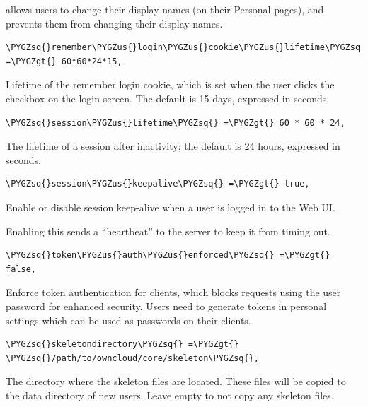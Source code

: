 \documentclass[letterpaper,10pt,english]{sphinxmanual}
\def\PYGZus{\char`\_}
\def\PYGZgt{\char`\>}
\def\PYGZsq{\char`\'}
\begin{document}
 allows users to change their display names (on their Personal
pages), and  prevents them from changing their display names.

\begin{Verbatim}[commandchars=\\\{\}]
\PYGZsq{}remember\PYGZus{}login\PYGZus{}cookie\PYGZus{}lifetime\PYGZsq{} =\PYGZgt{} 60*60*24*15,
\end{Verbatim}

Lifetime of the remember login cookie, which is set when the user clicks the
 checkbox on the login screen. The default is 15 days, expressed
in seconds.

\begin{Verbatim}[commandchars=\\\{\}]
\PYGZsq{}session\PYGZus{}lifetime\PYGZsq{} =\PYGZgt{} 60 * 60 * 24,
\end{Verbatim}

The lifetime of a session after inactivity; the default is 24 hours,
expressed in seconds.

\begin{Verbatim}[commandchars=\\\{\}]
\PYGZsq{}session\PYGZus{}keepalive\PYGZsq{} =\PYGZgt{} true,
\end{Verbatim}

Enable or disable session keep-alive when a user is logged in to the Web UI.

Enabling this sends a ``heartbeat'' to the server to keep it from timing out.

\begin{Verbatim}[commandchars=\\\{\}]
\PYGZsq{}token\PYGZus{}auth\PYGZus{}enforced\PYGZsq{} =\PYGZgt{} false,
\end{Verbatim}

Enforce token authentication for clients, which blocks requests using the user
password for enhanced security. Users need to generate tokens in personal settings
which can be used as passwords on their clients.

\begin{Verbatim}[commandchars=\\\{\}]
\PYGZsq{}skeletondirectory\PYGZsq{} =\PYGZgt{} \PYGZsq{}/path/to/owncloud/core/skeleton\PYGZsq{},
\end{Verbatim}

The directory where the skeleton files are located. These files will be
copied to the data directory of new users. Leave empty to not copy any
skeleton files.
\end{document}
